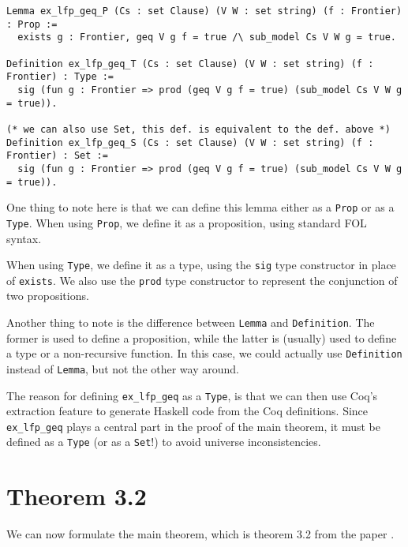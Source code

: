 \begin{minipage}{\linewidth}
\begin{lstlisting}[language=Coq, label={lst:ex_lfp_geq_def}, caption={Multiple defs. of \lstinline{ex_lfp_geq}}]
Lemma ex_lfp_geq_P (Cs : set Clause) (V W : set string) (f : Frontier) : Prop :=
  exists g : Frontier, geq V g f = true /\ sub_model Cs V W g = true.

Definition ex_lfp_geq_T (Cs : set Clause) (V W : set string) (f : Frontier) : Type :=
  sig (fun g : Frontier => prod (geq V g f = true) (sub_model Cs V W g = true)).

(* we can also use Set, this def. is equivalent to the def. above *)
Definition ex_lfp_geq_S (Cs : set Clause) (V W : set string) (f : Frontier) : Set :=
  sig (fun g : Frontier => prod (geq V g f = true) (sub_model Cs V W g = true)).
\end{lstlisting}
\end{minipage}

One thing to note here is that we can define this lemma either as a \lstinline{Prop} or as a \lstinline{Type}.
When using \lstinline{Prop}, we define it as a proposition, using standard FOL syntax.

When using \lstinline{Type}, we define it as a type,
using the \lstinline{sig} type constructor in place of \lstinline{exists}.
We also use the \lstinline{prod} type constructor to represent the conjunction of two propositions.

Another thing to note is the difference between \lstinline{Lemma} and \lstinline{Definition}.
The former is used to define a proposition, while the latter is (usually) used to define a type or a non-recursive function.
In this case, we could actually use \lstinline{Definition} instead of \lstinline{Lemma},
but not the other way around.

The reason for defining \lstinline{ex_lfp_geq} as a \lstinline{Type}, is that we can then use
Coq's extraction feature to generate Haskell code from the Coq definitions.
Since \lstinline{ex_lfp_geq} plays a central part in the proof of the main theorem,
it must be defined as a \lstinline{Type} (or as a \lstinline{Set}!) to avoid universe inconsistencies.

\section{Theorem 3.2}

We can now formulate the main theorem, which is theorem 3.2 from the paper \cite{mbezem}.

